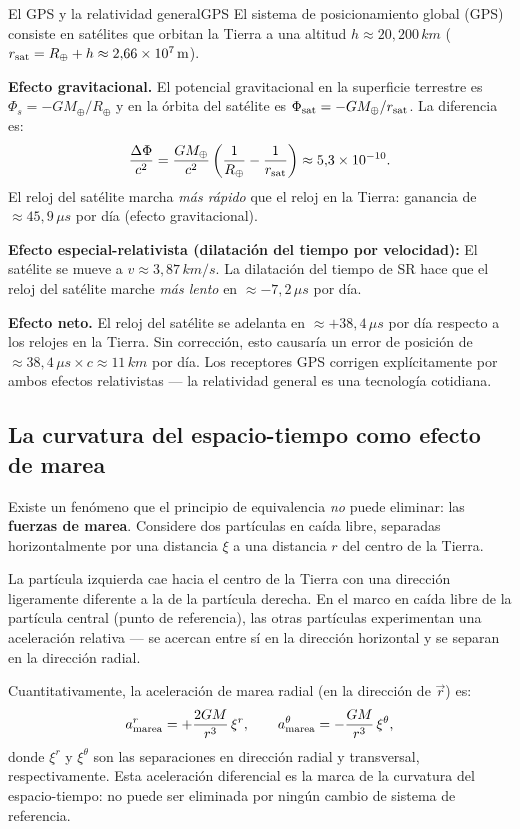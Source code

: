 \begin{ejemplo}{El GPS y la relatividad general}{GPS}
El sistema de posicionamiento global (GPS) consiste en satélites que orbitan la Tierra a una altitud $h \approx 20{,}200\,\si{km}$ ($r_{\rm sat} = R_\oplus + h \approx 2{,}66\times10^7\,\si{m}$).

\textbf{Efecto gravitacional.} El potencial gravitacional en la superficie terrestre es $\Phi_s = -GM_\oplus/R_\oplus$ y en la órbita del satélite es $\Phi_{\rm sat} = -GM_\oplus/r_{\rm sat}$. La diferencia es:
\[
  \frac{\Delta\Phi}{c^2} = \frac{GM_\oplus}{c^2}\left(\frac{1}{R_\oplus} - \frac{1}{r_{\rm sat}}\right)
  \approx 5{,}3\times10^{-10}.
\]
El reloj del satélite marcha \emph{más rápido} que el reloj en la Tierra: ganancia de $\approx 45{,}9\,\si{\mu s}$ por día (efecto gravitacional).

\textbf{Efecto especial-relativista (dilatación del tiempo por velocidad):} El satélite se mueve a $v \approx 3{,}87\,\si{km/s}$. La dilatación del tiempo de SR hace que el reloj del satélite marche \emph{más lento} en $\approx -7{,}2\,\si{\mu s}$ por día.

\textbf{Efecto neto.} El reloj del satélite se adelanta en $\approx +38{,}4\,\si{\mu s}$ por día respecto a los relojes en la Tierra. Sin corrección, esto causaría un error de posición de $\approx 38{,}4\,\si{\mu s} \times c \approx 11\,\si{km}$ por día. Los receptores GPS corrigen explícitamente por ambos efectos relativistas — la relatividad general es una tecnología cotidiana.
\end{ejemplo}

\subsection{La curvatura del espacio-tiempo como efecto de marea}

Existe un fenómeno que el principio de equivalencia \emph{no} puede eliminar: las \textbf{fuerzas de marea}. Considere dos partículas en caída libre, separadas horizontalmente por una distancia $\xi$ a una distancia $r$ del centro de la Tierra.

La partícula izquierda cae hacia el centro de la Tierra con una dirección ligeramente diferente a la de la partícula derecha. En el marco en caída libre de la partícula central (punto de referencia), las otras partículas experimentan una aceleración relativa — se acercan entre sí en la dirección horizontal y se separan en la dirección radial.

Cuantitativamente, la aceleración de marea radial (en la dirección de $\vec{r}$) es:
\begin{equation}
  a_{\rm marea}^r = +\frac{2GM}{r^3}\,\xi^r, \qquad
  a_{\rm marea}^\theta = -\frac{GM}{r^3}\,\xi^\theta,
  \label{eq:mareas}
\end{equation}
donde $\xi^r$ y $\xi^\theta$ son las separaciones en dirección radial y transversal, respectivamente. Esta aceleración diferencial es la marca de la curvatura del espacio-tiempo: no puede ser eliminada por ningún cambio de sistema de referencia.

